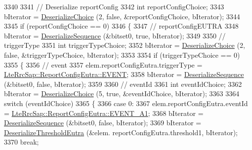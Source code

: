 \begin{DoxyCode}
3340 
3341           \textcolor{comment}{// Deserialize reportConfig}
3342           \textcolor{keywordtype}{int} reportConfigChoice;
3343           bIterator = \hyperlink{classns3_1_1Asn1Header_a0af5881f07a0549a8693a1b75c229a90}{DeserializeChoice} (2, \textcolor{keyword}{false}, &reportConfigChoice, bIterator);
3344 
3345           \textcolor{keywordflow}{if} (reportConfigChoice == 0)
3346             \{
3347               \textcolor{comment}{// reportConfigEUTRA}
3348               bIterator = \hyperlink{classns3_1_1Asn1Header_a58c68bb97ba3fe2e8fcdd7c208d672b2}{DeserializeSequence} (&bitset0, \textcolor{keyword}{true}, bIterator);
3349 
3350               \textcolor{comment}{// triggerType}
3351               \textcolor{keywordtype}{int} triggerTypeChoice;
3352               bIterator = \hyperlink{classns3_1_1Asn1Header_a0af5881f07a0549a8693a1b75c229a90}{DeserializeChoice} (2, \textcolor{keyword}{false}, &triggerTypeChoice, bIterator);
3353 
3354               \textcolor{keywordflow}{if} (triggerTypeChoice == 0)
3355                 \{
3356                   \textcolor{comment}{// event}
3357                   elem.reportConfigEutra.triggerType = 
      \hyperlink{structns3_1_1LteRrcSap_1_1ReportConfigEutra_a457763ab0765f15b66c62f8177fa412ea492651ea4b8c0f484edb0c018e908fcf}{LteRrcSap::ReportConfigEutra::EVENT};
3358                   bIterator = \hyperlink{classns3_1_1Asn1Header_a58c68bb97ba3fe2e8fcdd7c208d672b2}{DeserializeSequence} (&bitset0, \textcolor{keyword}{false}, bIterator);
3359 
3360                   \textcolor{comment}{// eventId}
3361                   \textcolor{keywordtype}{int} eventIdChoice;
3362                   bIterator = \hyperlink{classns3_1_1Asn1Header_a0af5881f07a0549a8693a1b75c229a90}{DeserializeChoice} (5, \textcolor{keyword}{true}, &eventIdChoice, bIterator);
3363 
3364                   \textcolor{keywordflow}{switch} (eventIdChoice)
3365                     \{
3366                     \textcolor{keywordflow}{case} 0:
3367                       elem.reportConfigEutra.eventId = 
      \hyperlink{structns3_1_1LteRrcSap_1_1ReportConfigEutra_ab8152dc095987f60bee2e9115046902fa9c0b835cb85601f8a9e424fbf0afab4b}{LteRrcSap::ReportConfigEutra::EVENT\_A1};
3368                       bIterator = \hyperlink{classns3_1_1Asn1Header_a58c68bb97ba3fe2e8fcdd7c208d672b2}{DeserializeSequence} (&bitset0, \textcolor{keyword}{false}, bIterator);
3369                       bIterator = \hyperlink{classns3_1_1RrcAsn1Header_a80f5e686675bee0701149a16b9f2d37b}{DeserializeThresholdEutra} (&elem.
      reportConfigEutra.threshold1, bIterator);
3370                       \textcolor{keywordflow}{break};

\end{DoxyCode}

